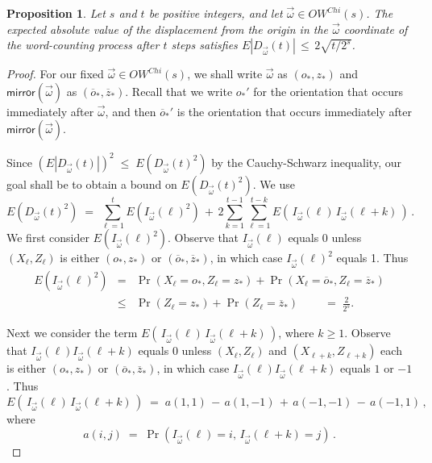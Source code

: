 \documentclass[10pt,a4paper]{amsart}
\newtheorem{proposition}{Proposition}
\newcommand{\mirror}{\textsf{mirror}}
\begin{document}
\begin{proposition}
   \label{prop.Jbound}
Let $s$ and $t$ be positive integers, and let $\vec{\omega}\in OW^{Chi}(s)$. The expected absolute value of the displacement from the origin in the $\vec{\omega}$ coordinate of the word-counting process after $t$ steps satisfies 
$E| D_{\vec{\omega}}(t)|   \,\leq \,  2\sqrt{t/2^s}$.   
\end{proposition}

\begin{proof}
For our fixed $\vec{\omega}\in OW^{Chi}(s)$, we shall write
 $\vec{\omega}$ as $(o_*,z_*)$ and 
 $\mirror(\vec{\omega})$ as $(\overline{o}_*,\overline{z}_*)$.  
Recall that we write $o_*'$ for the orientation that occurs immediately after $\vec{\omega}$, and then $\overline{o}_*'$ is the orientation that occurs immediately after $\mirror(\vec{\omega})$.

Since $\left(E|D_{\vec{\omega}}(t)|\right)^2 \;\leq \;  E(D_{\vec{\omega}}(t)^2)$ by the Cauchy-Schwarz inequality, our goal shall be to obtain a bound on $E(D_{\vec{\omega}}(t)^2)$.  We use 
\begin{equation}
   \label{eq.JsumI}
     E(D_{\vec{\omega}}(t)^2)  \;=\;  \sum_{\ell=1}^t E(I_{\vec{\omega}}(\ell)^2)  \,+\,  2 \sum_{k=1}^{t-1} \sum_{\ell=1}^{t-k}  E( \,I_{\vec{\omega}}(\ell)\,I_{\vec{\omega}}(\ell+k)\, ) \,.
\end{equation}
We first consider $E(I_{\vec{\omega}}(\ell)^2)$.  Observe that $I_{\vec{\omega}}(\ell)$ equals 0 unless $(X_\ell,Z_\ell)$ is either $(o_*,z_*)$ or $(\overline{o}_*,\overline{z}_*)$, in which 
case $I_{\vec{\omega}}(\ell)^2$ equals 1.
Thus
\begin{eqnarray} 
    \nonumber
    E(I_{\vec{\omega}}(\ell)^2)  &=&  \Pr(X_\ell=o_*,Z_\ell=z_*)+\Pr(X_\ell=\overline{o}_*,Z_\ell=\overline{z}_*)   \\
    \label{eq.I2bound}
  & \leq &    \Pr(Z_\ell=z_*)+\Pr(Z_\ell=\overline{z}_*) \qquad\;=\;  \frac{2}{2^{s}}.
\end{eqnarray}


Next  we consider the term $ E( \,I_{\vec{\omega}}(\ell)\,I_{\vec{\omega}}(\ell+k)\, )$, where $k\geq 1$.
Observe that $I_{\vec{\omega}}(\ell)I_{\vec{\omega}}(\ell+k)$ equals 0 unless $(X_\ell,Z_\ell)$ and $(X_{\ell+k},Z_{\ell+k})$ each is either $(o_*,z_*)$ or $(\overline{o}_*,\overline{z}_*)$, in which 
case $I_{\vec{\omega}}(\ell)I_{\vec{\omega}}(\ell+k)$ equals $1$ or $-1$.
Thus 
\begin{equation}
    \label{eq.Eaaaa}
     E(\,I_{\vec{\omega}}(\ell)\,I_{\vec{\omega}}(\ell+k)\, )   \;=\;  a(1,1) \,-\,a(1,-1) \,+\,a(-1,-1)\,-\,a(-1,1) \,,
\end{equation}
where
\[    a(i,j)   \;=\;  \Pr(I_{\vec{\omega}}(\ell)=i, \,I_{\vec{\omega}}(\ell+k)=j)\,.
\]


\end{proof}
\end{document}

